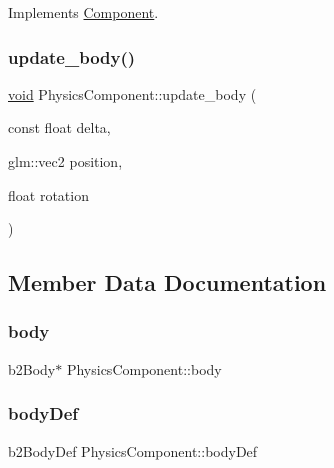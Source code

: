 Implements \hyperlink{classComponent_a3448977e6f464df89e77dda7c6f52204}{Component}.

\mbox{\label{classPhysicsComponent_abbbd38f9a42a3fa09d42535b389e5b41}} 
\subsubsection{\texorpdfstring{update\+\_\+body()}{update\_body()}}
{\footnotesize\ttfamily \hyperlink{imgui__impl__opengl3__loader_8h_ac668e7cffd9e2e9cfee428b9b2f34fa7}{void} Physics\+Component\+::update\+\_\+body (\begin{DoxyParamCaption}\item[{const float}]{delta,  }\item[{glm\+::vec2}]{position,  }\item[{float}]{rotation }\end{DoxyParamCaption})}



\subsection{Member Data Documentation}
\mbox{\label{classPhysicsComponent_a643c8078ab0823f37ae62dd98c316b9f}} 
\subsubsection{\texorpdfstring{body}{body}}
{\footnotesize\ttfamily b2\+Body$\ast$ Physics\+Component\+::body\hspace{0.3cm}{\ttfamily [private]}}

\mbox{\label{classPhysicsComponent_ad2f5ffe4163e08e6f16fa222bf633474}} 
\subsubsection{\texorpdfstring{body\+Def}{bodyDef}}
{\footnotesize\ttfamily b2\+Body\+Def Physics\+Component\+::body\+Def\hspace{0.3cm}{\ttfamily [private]}}


